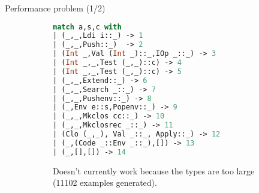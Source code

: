 \documentclass[aspectratio=169
  , xcolor={svgnames}
  , hyperref={ colorlinks,citecolor=Blue
             , linkcolor=DarkRed,urlcolor=DarkBlue}
  , russian
  ]{beamer}
\begin{document}
\begin{frame}[fragile]{Performance problem (1/2)}
\begin{figure}
\begin{subfigure}[b]{0.5\linewidth}
\begin{lstlisting}[basicstyle=\small,language=ocaml]
match a,s,c with
| (_,_,Ldi i::_) -> 1
| (_,_,Push::_)  -> 2
| (Int _,Val (Int _)::_,IOp _::_) -> 3
| (Int _,_,Test (_,_)::c) -> 4
| (Int _,_,Test (_,_)::c) -> 5
| (_,_,Extend::_) -> 6
| (_,_,Search _::_) -> 7
| (_,_,Pushenv::_) -> 8
| (_,Env e::s,Popenv::_) -> 9
| (_,_,Mkclos cc::_) -> 10
| (_,_,Mkclosrec _::_) -> 11
| (Clo (_,_), Val _::_, Apply::_) -> 12
| (_,(Code _::Env _::_),[]) -> 13
| (_,[],[]) -> 14
\end{lstlisting}
\end{subfigure}
\hspace{1cm}
\begin{subfigure}[b]{0.35\linewidth}
Doesn't currently work because the types are too large (11102 examples  generated).\\

\vspace{1cm}
\end{subfigure}
\end{figure}
\end{frame}
\end{document}
